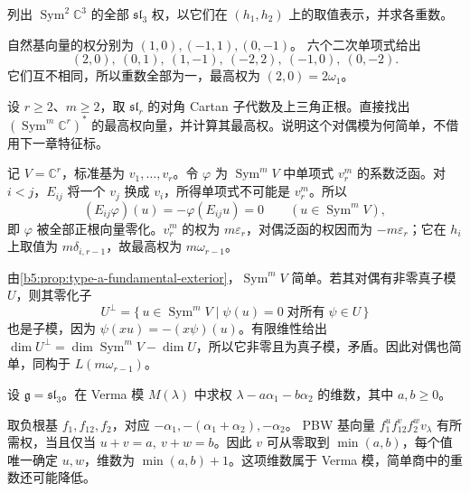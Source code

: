 \begin{exercise}\label{b5:ex:18-symmetric-square-weights}
	列出 \(\operatorname{Sym}^2\mathbb C^3\) 的全部 \(\mathfrak{sl}_3\) 权，以它们在 \((h_1,h_2)\) 上的取值表示，并求各重数。
\end{exercise}
\begin{solution}
	自然基向量的权分别为 \((1,0),(-1,1),(0,-1)\)。 六个二次单项式给出
	\[
		(2,0),\ (0,1),\ (1,-1),\ (-2,2),\ (-1,0),\ (0,-2).
	\]
	它们互不相同，所以重数全部为一，最高权为 \((2,0)=2\omega_1\)。
\end{solution}

\begin{exercise}\label{b5:ex:18-dual-natural-highest}
	设 \(r\ge2\)、\(m\ge2\)，取 \(\mathfrak{sl}_r\) 的对角 Cartan 子代数及上三角正根。直接找出 \((\operatorname{Sym}^m\mathbb C^r)^*\) 的最高权向量，并计算其最高权。说明这个对偶模为何简单，不借用下一章特征标。
\end{exercise}
\begin{solution}
	记 \(V=\mathbb C^r\)，标准基为 \(v_1,\ldots,v_r\)。令 \(\varphi\) 为 \(\operatorname{Sym}^mV\) 中单项式 \(v_r^m\) 的系数泛函。对 \(i<j\)，\(E_{ij}\) 将一个 \(v_j\) 换成 \(v_i\)，所得单项式不可能是 \(v_r^m\)。所以
	\[
		(E_{ij}\varphi)(u)=-\varphi(E_{ij}u)=0 \qquad(u\in\operatorname{Sym}^mV),
	\]
	即 \(\varphi\) 被全部正根向量零化。\(v_r^m\) 的权为 \(m\varepsilon_r\)，对偶泛函的权因而为 \(-m\varepsilon_r\)；它在 \(h_i\) 上取值为 \(m\delta_{i,r-1}\)，故最高权为 \(m\omega_{r-1}\)。

	由\cref{b5:prop:type-a-fundamental-exterior}，\(\operatorname{Sym}^mV\) 简单。若其对偶有非零真子模 \(U\)，则其零化子
	\[
		U^\perp=\{\,u\in\operatorname{Sym}^mV\mid\psi(u)=0\;\text{对所有}\;\psi\in U\,\}
	\]
	也是子模，因为 \(\psi(xu)=-(x\psi)(u)\)。有限维性给出 \(\dim U^\perp=\dim\operatorname{Sym}^mV-\dim U\)，所以它非零且为真子模，矛盾。因此对偶也简单，同构于 \(L(m\omega_{r-1})\)。
\end{solution}

\begin{exercise}\label{b5:ex:18-verma-a2-weights}
	设 \(\mathfrak g=\mathfrak{sl}_3\)。在 Verma 模 \(M(\lambda)\) 中求权 \(\lambda-a\alpha_1-b\alpha_2\) 的维数，其中 \(a,b\ge0\)。
\end{exercise}
\begin{solution}
	取负根基 \(f_1,f_{12},f_2\)，对应 \(-\alpha_1,-(\alpha_1+\alpha_2),-\alpha_2\)。 PBW 基向量 \(f_1^u f_{12}^v f_2^wv_\lambda\) 有所需权，当且仅当 \(u+v=a,\ v+w=b\)。因此 \(v\) 可从零取到 \(\min(a,b)\)，每个值唯一确定 \(u,w\)，维数为 \(\min(a,b)+1\)。这项维数属于 Verma 模，简单商中的重数还可能降低。
\end{solution}

